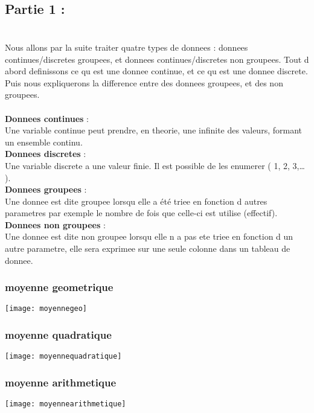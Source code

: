 \documentclass[a4paper,12pt,reqno]{article}
\newcommand{\newparagraphe}[1]{\paragraph{#1}\mbox{}\\}
\begin{document}
\subsection{Partie 1 : }
\newparagraphe{}
Nous allons par la suite traiter quatre types de donnees : donnees continues/discretes groupees, et donnees continues/discretes non groupees. 
Tout d abord definissons ce qu est une donnee continue, et ce qu est une donnee discrete. Puis nous expliquerons la difference entre des donnees groupees, et des non groupees.
\\
\\

\textbf{Donnees continues} :
\\Une variable continue peut prendre, en theorie, une infinite des valeurs, formant un ensemble continu.\\

\textbf{Donnees discretes} :
\\Une variable discrete a une valeur finie. Il est possible de les enumerer (  1, 2, 3,… ).\\ 

\textbf{Donnees groupees} :
\\Une donnee est dite groupee lorsqu elle a été triee en fonction d autres parametres  par exemple le nombre de fois que celle-ci est utilise (effectif).\\

\textbf{Donnees non groupees} :
\\Une donnee est dite non groupee lorsqu elle n a pas ete triee en fonction d un autre parametre, elle sera exprimee sur une seule colonne dans un tableau de donnee.\\


\subsubsection{moyenne geometrique}
\texttt{[image: moyennegeo]}\\

\subsubsection{moyenne quadratique}
\texttt{[image: moyennequadratique]}\\

\subsubsection{moyenne arithmetique}
\texttt{[image: moyennearithmetique]}\\
\end{document}
